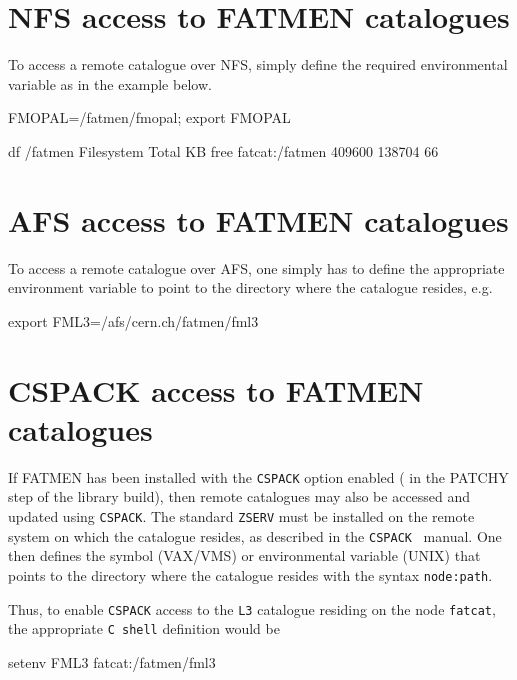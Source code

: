 \section{NFS access to FATMEN catalogues}
\par
{}
To access a remote catalogue over NFS, simply define
the required environmental variable as in the example
below.
\begin{XMP}
FMOPAL=/fatmen/fmopal; export FMOPAL

df /fatmen
Filesystem    Total KB    free %
fatcat:/fatmen  409600  138704   66%

\end{XMP}

\section{AFS access to FATMEN catalogues}
To access a remote catalogue over AFS, one simply
has to define the appropriate environment variable
to point to the directory where the catalogue resides,
e.g.

\begin{XMP}
export FML3=/afs/cern.ch/fatmen/fml3
\end{XMP}

\section{CSPACK access to FATMEN catalogues}

If FATMEN has been installed with the {\tt CSPACK}
option enabled ( in the PATCHY step of
the library build), then remote catalogues may also
be accessed and updated using {\tt CSPACK}. The
standard {\tt ZSERV} must be installed on the remote
system on which the catalogue resides, as described in
the {\tt CSPACK}~\cite{bib-CSPACK} manual. One then defines
the symbol (VAX/VMS) or environmental variable (UNIX)
that points to the directory where the catalogue resides
with the syntax {\tt node:path}.

Thus, to enable {\tt CSPACK} access to the {\tt L3}
catalogue residing on the node {\tt fatcat}, the
appropriate {\tt C shell} definition would be

\begin{XMP}
setenv FML3 fatcat:/fatmen/fml3
\end{XMP}

